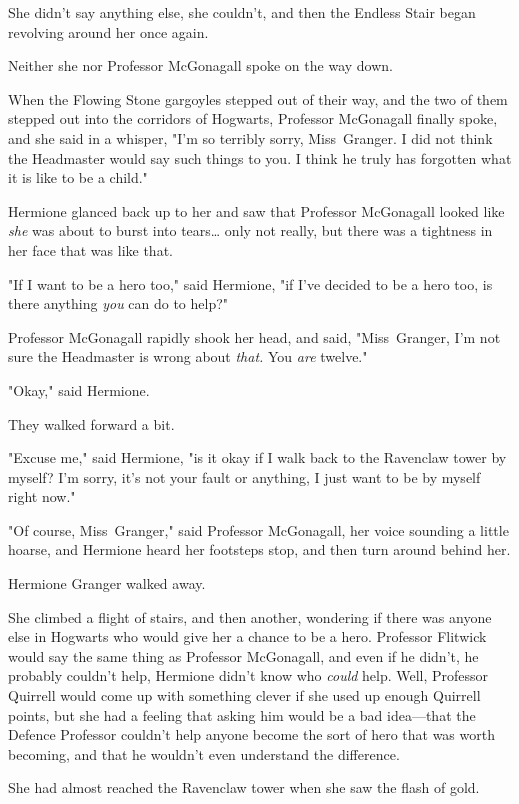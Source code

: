 She didn't say anything else, she couldn't, and then the Endless Stair began
revolving around her once again.

Neither she nor Professor McGonagall spoke on the way down.

When the Flowing Stone gargoyles stepped out of their way, and the two of them
stepped out into the corridors of Hogwarts, Professor McGonagall finally spoke,
and she said in a whisper, "I'm so terribly sorry, Miss~Granger. I did not
think the Headmaster would say such things to you. I think he truly has
forgotten what it is like to be a child."

Hermione glanced back up to her and saw that Professor McGonagall looked like
\emph{she} was about to burst into tears{\ldots} only not really, but there was
a tightness in her face that was like that.

"If I want to be a hero too," said Hermione, "if I've decided to be a hero too,
is there anything \emph{you} can do to help?"

Professor McGonagall rapidly shook her head, and said, "Miss~Granger, I'm not
sure the Headmaster is wrong about \emph{that.} You \emph{are} twelve."

"Okay," said Hermione.

They walked forward a bit.

"Excuse me," said Hermione, "is it okay if I walk back to the Ravenclaw tower
by myself? I'm sorry, it's not your fault or anything, I just want to be by
myself right now."

"Of course, Miss~Granger," said Professor McGonagall, her voice sounding a
little hoarse, and Hermione heard her footsteps stop, and then turn around
behind her.

Hermione Granger walked away.

She climbed a flight of stairs, and then another, wondering if there was anyone
else in Hogwarts who would give her a chance to be a hero. Professor Flitwick
would say the same thing as Professor McGonagall, and even if he didn't, he
probably couldn't help, Hermione didn't know who \emph{could} help. Well,
Professor Quirrell would come up with something clever if she used up enough
Quirrell points, but she had a feeling that asking him would be a bad
idea---that the Defence Professor couldn't help anyone become the sort of hero
that was worth becoming, and that he wouldn't even understand the difference.

She had almost reached the Ravenclaw tower when she saw the flash of gold.
